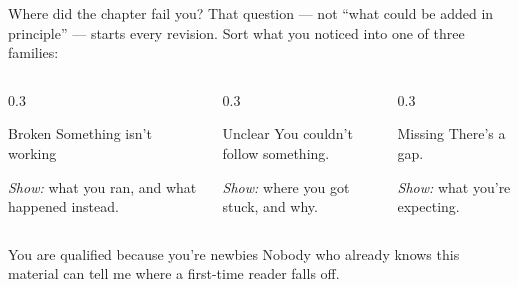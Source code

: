 \documentclass[9pt,aspectratio=169]{beamer}
\begin{document}
\begin{frame}{Where did the chapter fail you?}
    That question --- not ``what could be added in principle'' --- starts every revision. Sort what you noticed into one of three families:

    \bigskip

    \begin{columns}[T]
        \begin{column}{0.3\textwidth}
            \begin{block}{Broken}\footnotesize 
                Something isn't working
                \smallskip

                \textit{Show:} what you ran, and what happened instead.
            \end{block}
        \end{column}
        \begin{column}{0.3\textwidth}
            \begin{block}{Unclear}\footnotesize 
            You couldn't follow something.
                \smallskip

                \textit{Show:} where you got stuck, and why.
            \end{block}
        \end{column}
        \begin{column}{0.3\textwidth}
            \begin{block}{Missing}
                \footnotesize There's a gap.
                \smallskip

                \textit{Show:} what you're expecting.
            \end{block}
        \end{column}
    \end{columns}

    \bigskip

    \begin{alertblock}{You are qualified because you're newbies}
        Nobody who already knows this material can tell me where a first-time reader falls off.
    \end{alertblock}
\end{frame}
\end{document}

